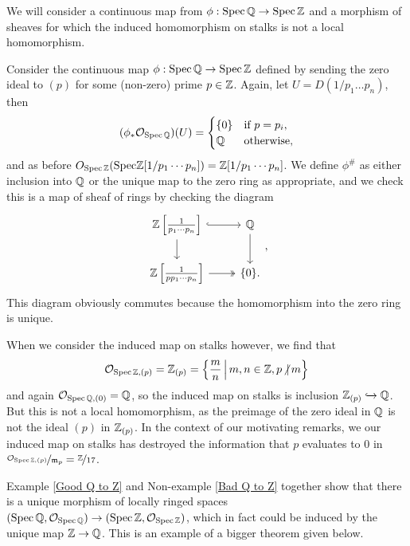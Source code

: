 \begin{nonexample} \label{Bad Q to Z}
We will consider a continuous map from $\phi : \operatorname{Spec}\mathbb{Q} \to \operatorname{Spec}\mathbb{Z}$ and a morphism of sheaves for which the induced homomorphism on stalks is not a local homomorphism.

Consider the continuous map $\phi : \operatorname{Spec}\mathbb{Q} \to \operatorname{Spec}\mathbb{Z}$ defined by sending the zero ideal to $(p)$ for some (non-zero) prime $p \in \mathbb{Z}$. Again, let $U = D(1/p_1\dots p_n)$, then
\begin{equation}
(\phi_\ast\mathcal{O}_{\operatorname{Spec}\mathbb{Q}}) (U) 	= 	\begin{cases}
\{0\} 	&\text{if } p = p_i,\\
\mathbb{Q} &\text{otherwise},
\end{cases}
\end{equation}
and as before $O_{\operatorname{Spec}\mathbb{Z}}(\textnormal{Spec}\mathbb{Z}[1/p_1\cdots p_n]) = \mathbb{Z}[1/p_1\cdots p_n]$. We define $\phi^\#$ as either inclusion into $\mathbb{Q}$ or the unique map to the zero ring as appropriate, and we check this is a map of sheaf of rings by checking the diagram
\begin{equation}
\begin{tikzcd}
\Z\left[\frac{1}{p_1 \cdots p_n}\right] 	\arrow[r, hook] \arrow[d]
& \Q \arrow[d] \\
\Z\left[\frac{1}{p p_1 \cdots p_n}\right] \arrow[r, two heads] & \{0\}.
\end{tikzcd},
\end{equation}
This diagram obviously commutes because the homomorphism into the zero ring is unique. 

When we consider the induced map on stalks however, we find that
\begin{equation}
\mathcal{O}_{\operatorname{Spec}\mathbb{Z},(p)} 
=
\mathbb{Z}_{(p)}
=
\left\{ \frac{m}{n} \, \Big| \, m,n \in \mathbb{Z}, p \!\not| \,m \right\}
\end{equation}
and again $\mathcal{O}_{\operatorname{Spec}\mathbb{Q}, (0)} = \mathbb{Q}$, so the induced map on stalks is inclusion $\mathbb{Z}_{(p)} \xhookrightarrow{} \mathbb{Q}$. But this is not a local homomorphism, as the preimage of the zero ideal in $\mathbb{Q}$ is not the ideal $(p)$ in $\mathbb{Z}_{(p)}$. In the context of our motivating remarks, we our induced map on stalks has destroyed the information that $p$ evaluates to 0 in $\nicefrac{\mathcal{O}_{\operatorname{Spec}\mathbb{Z},(p)}}{\mathfrak{m}_p} = \nicefrac{\mathbb{Z}}{17}$.
\end{nonexample}

\begin{remark}
Example \ref{Good Q to Z} and Non-example \ref{Bad Q to Z} together show that there is a unique morphism of locally ringed spaces $(\operatorname{Spec}\mathbb{Q}, \mathcal{O}_{\operatorname{Spec}\mathbb{Q}}) \to (\operatorname{Spec}\mathbb{Z}, \mathcal{O}_{\operatorname{Spec}\mathbb{Z}})$, which in fact could be induced by the unique map $\mathbb{Z} \to \mathbb{Q}$. This is an example of a bigger theorem given below.
\end{remark}

